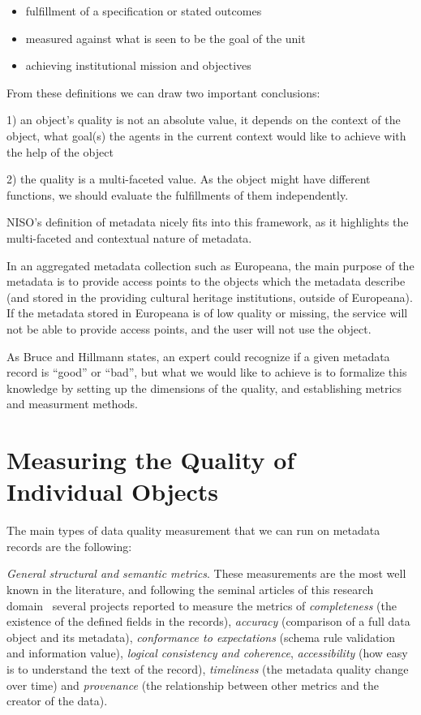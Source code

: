 \begin{itemize}
 \setlength{\parskip}{0pt}
 \setlength{\itemsep}{0pt plus 1pt}
 \item fulfillment of a specification or stated outcomes
 \item measured against what is seen to be the goal of the unit
 \item achieving institutional mission and objectives
\end{itemize}

From these definitions we can draw two important conclusions: 

1) an object's quality is not an absolute value, it depends on the context of the object, what goal(s) the agents in the current context would like to achieve with the help of the object

2) the quality is a multi-faceted value. As the object might have different functions, we should evaluate the fulfillments of them independently.

NISO's definition of metadata nicely fits into this framework, as it highlights the multi-faceted and contextual nature of metadata.

In an aggregated metadata collection such as Europeana, the main purpose of the metadata is to provide access points to the objects which the metadata describe (and stored in the providing cultural heritage institutions, outside of Europeana). If the metadata stored in Europeana is of low quality or missing, the service will not be able to provide access points, and the user will not use the object.


As Bruce and Hillmann states, an expert could recognize if a given metadata record is ``good'' or ``bad'', but what we would like to achieve is to formalize this knowledge by setting up the dimensions of the quality, and establishing metrics and measurment methods.


\section{Measuring the Quality of Individual Objects}

The main types of data quality measurement that we can run on metadata records are the following:

\emph{General structural and semantic metrics}. These measurements are the most well known in the literature, and following the seminal articles of this research domain~\cite{bruce-hillmann2004, ochoa-duval2009} several projects reported to measure the metrics of \emph{completeness} (the existence of the defined fields in the records), \emph{accuracy} (comparison of a full data object and its metadata), \emph{conformance to expectations} (schema rule validation and information value), \emph{logical consistency and coherence}, \emph{accessibility} (how easy is to understand the text of the record), \emph{timeliness} (the metadata quality change over time) and \emph{provenance} (the relationship between other metrics and the creator of the data).

